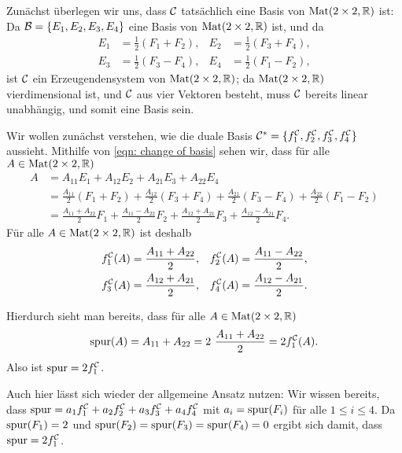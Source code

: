 \documentclass[a4paper,10pt]{article}
\begin{document}
Zunächst überlegen wir uns, dass $\mathcal{C}$ tatsächlich eine Basis von $\mathrm{Mat}(2 \times 2, \mathbb{R})$ ist: Da $\mathcal{B} = \{E_1, E_2, E_3, E_4\}$ eine Basis von $\mathrm{Mat}(2 \times 2, \mathbb{R})$ ist, und da
\begin{equation}\label{eqn: change of basis}
 \begin{aligned}
  E_1 &= \frac{1}{2}(F_1+F_2), &
  E_2 &= \frac{1}{2}(F_3+F_4), \\
  E_3 &= \frac{1}{2}(F_3-F_4), &
  E_4 &= \frac{1}{2}(F_1-F_2),
 \end{aligned}
\end{equation}
ist $\mathcal{C}$ ein Erzeugendensystem von $\mathrm{Mat}(2 \times 2, \mathbb{R})$; da $\mathrm{Mat}(2 \times 2, \mathbb{R})$ vierdimensional ist, und $\mathcal{C}$ aus vier Vektoren besteht, muss $\mathcal{C}$ bereits linear unabhängig, und somit eine Basis sein.

Wir wollen zunächst verstehen, wie die duale Basis $\mathcal{C}^* = \{f^{\mathcal{C}}_1, f^{\mathcal{C}}_2, f^{\mathcal{C}}_3, f^{\mathcal{C}}_4\}$ aussieht. Mithilfe von \eqref{eqn: change of basis} sehen wir, dass für alle $A \in \mathrm{Mat}(2 \times 2, \mathbb{R})$
\begin{align*}
 A
 &= A_{11} E_1 + A_{12} E_2 + A_{21} E_3 + A_{22} E_4 \\
 &= \frac{A_{11}}{2} (F_1 + F_2) + \frac{A_{12}}{2} (F_3 + F_4)
   + \frac{A_{21}}{2} (F_3 - F_4) + \frac{A_{22}}{2} (F_1 - F_2) \\
 &= \frac{A_{11}+A_{22}}{2} F_1 + \frac{A_{11}-A_{22}}{2} F_2 + \frac{A_{12}+A_{21}}{2} F_3 + \frac{A_{12}-A_{21}}{2} F_4.
\end{align*}
Für alle $A \in \mathrm{Mat}(2 \times 2, \mathbb{R})$ ist deshalb
\begin{equation*}
 \begin{aligned}
  f^{\mathcal{C}}_1(A) &= \frac{A_{11}+A_{22}}{2}, &
  f^{\mathcal{C}}_2(A) &= \frac{A_{11}-A_{22}}{2}, \\
  f^{\mathcal{C}}_3(A) &= \frac{A_{12}+A_{21}}{2}, &
  f^{\mathcal{C}}_4(A) &= \frac{A_{12}-A_{21}}{2}.
 \end{aligned}
\end{equation*}

Hierdurch sieht man bereits, dass für alle $A \in \mathrm{Mat}(2 \times 2, \mathbb{R})$
\[
 \mathrm{spur}(A)
 = A_{11} + A_{22}
 = 2 \ \frac{A_{11} + A_{22}}{2}
 = 2 f^{\mathcal{C}}_1(A).
\]
Also ist $\mathrm{spur} = 2f^{\mathcal{C}}_1$. 

Auch hier lässt sich wieder der allgemeine Ansatz nutzen: Wir wissen bereits, dass $\mathrm{spur} = a_1 f^{\mathcal{C}}_1 + a_2 f^{\mathcal{C}}_2 + a_3 f^{\mathcal{C}}_3 + a_4 f^{\mathcal{C}}_4$ mit $a_i = \mathrm{spur}(F_i)$ für alle $1 \leq i \leq 4$. Da $\mathrm{spur}(F_1) = 2$ und $\mathrm{spur}(F_2) = \mathrm{spur}(F_3) = \mathrm{spur}(F_4) = 0$ ergibt sich damit, dass $\mathrm{spur} = 2 f^{\mathcal{C}}_1$.
\end{document}

